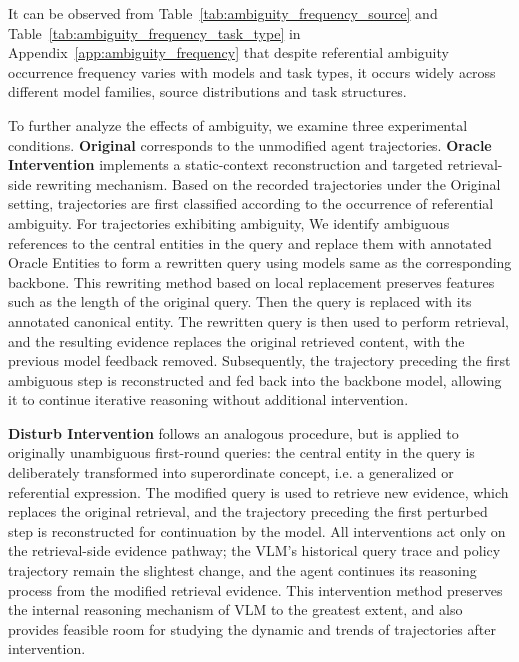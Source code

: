 \documentclass{article} %
\begin{document}
It can be observed from Table~\ref{tab:ambiguity_frequency_source} and Table~\ref{tab:ambiguity_frequency_task_type} in Appendix~\ref{app:ambiguity_frequency} that despite referential ambiguity occurrence frequency varies with models and task types, it occurs widely across different model families, source distributions and task structures.  

To further analyze the effects of ambiguity, we examine three experimental conditions.
\textbf{Original} corresponds to the unmodified agent trajectories.
\textbf{Oracle Intervention} implements a static-context reconstruction and targeted retrieval-side rewriting mechanism. Based on the recorded trajectories under the Original setting, trajectories are first classified according to the occurrence of referential ambiguity. For trajectories exhibiting ambiguity,  We identify ambiguous references to the central entities in the query and replace them with annotated Oracle Entities to form a rewritten query using models same as the corresponding backbone. This rewriting method based on local replacement preserves features such as the length of the original query. Then the query is replaced with its annotated canonical entity. The rewritten query is then used to perform retrieval, and the resulting evidence replaces the original retrieved content, with the previous model feedback removed. Subsequently, the trajectory preceding the first ambiguous step is reconstructed and fed back into the backbone model, allowing it to continue iterative reasoning without additional intervention.

\textbf{Disturb Intervention} follows an analogous procedure, but is applied to originally unambiguous first-round queries: the central entity in the query is deliberately transformed into superordinate concept, i.e. a generalized or referential expression. The modified query is used to retrieve new evidence, which replaces the original retrieval, and the trajectory preceding the first perturbed step is reconstructed for continuation by the model.
All interventions act only on the retrieval-side evidence pathway; the VLM's historical query trace and policy trajectory remain the slightest change, and the agent continues its reasoning process from the modified retrieval evidence. This intervention method preserves the internal reasoning mechanism of VLM to the greatest extent, and also provides feasible room for studying the dynamic and trends of trajectories after intervention.
\end{document}
